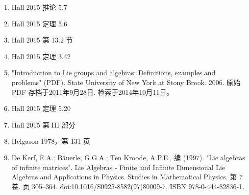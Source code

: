 \begin{enumerate}
\item Hall 2015 推论 5.7
\item Hall 2015 定理 5.6
\item Hall 2015 第 13.2 节
\item Hall 2015 定理 3.42
\item "Introduction to Lie groups and algebras: Definitions, examples and problems" (PDF). State University of New York at Stony Brook. 2006. 原始 PDF 存档于2011年9月28日. 检索于2014年10月11日。
\item Hall 2015 定理 5.20
\item Hall 2015 第 III 部分
\item Helgason 1978，第 131 页
\item De Kerf, E.A.; Bäuerle, G.G.A.; Ten Kroode, A.P.E., 编 (1997). "Lie algebras of infinite matrices". Lie Algebras - Finite and Infinite Dimensional Lie Algebras and Applications in Physics. Studies in Mathematical Physics. 第 7 卷. 页 305–364. doi:10.1016/S0925-8582(97)80009-7. ISBN 978-0-444-82836-1.
\end{enumerate}
